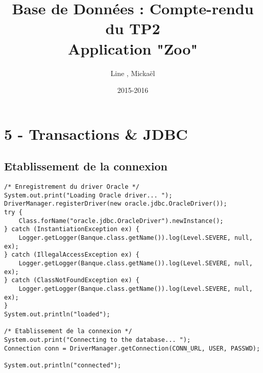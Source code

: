 \documentclass{article}
\title{Base de Données : Compte-rendu du TP2\\Application "Zoo"}
\author{Line \bsc{POUVARET}, Mickaël \bsc{TURNEL}}
\date{2015-2016}
\begin{document}
\maketitle

\section*{5 -	Transactions \& JDBC}
\subsection*{Etablissement de la connexion}
	\begin{lstlisting}
/* Enregistrement du driver Oracle */
System.out.print("Loading Oracle driver... "); 
DriverManager.registerDriver(new oracle.jdbc.OracleDriver());
try {
	Class.forName("oracle.jdbc.OracleDriver").newInstance();
} catch (InstantiationException ex) {
	Logger.getLogger(Banque.class.getName()).log(Level.SEVERE, null, ex);
} catch (IllegalAccessException ex) {
	Logger.getLogger(Banque.class.getName()).log(Level.SEVERE, null, ex);
} catch (ClassNotFoundException ex) {
	Logger.getLogger(Banque.class.getName()).log(Level.SEVERE, null, ex);
}
System.out.println("loaded");
  	    
/* Etablissement de la connexion */
System.out.print("Connecting to the database... "); 
Connection conn = DriverManager.getConnection(CONN_URL, USER, PASSWD);
            
System.out.println("connected");
	\end{lstlisting}
\end{document}
